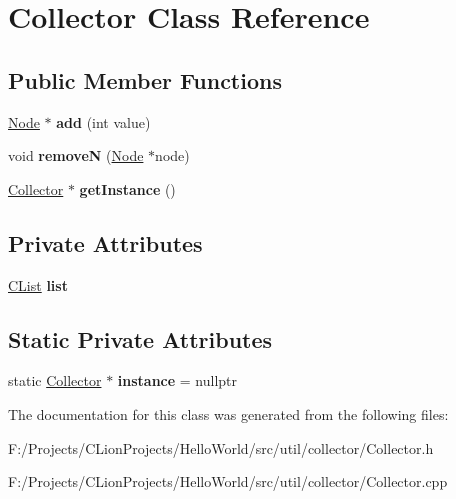 \hypertarget{class_collector}{}\section{Collector Class Reference}
\label{class_collector}
\subsection*{Public Member Functions}
\begin{DoxyCompactItemize}
\item 
\mbox{\label{class_collector_a29df7f72d577c7723f67e09a47189f29}} 
\mbox{\hyperlink{class_node}{Node}} $\ast$ {\bfseries add} (int value)
\item 
\mbox{\label{class_collector_ae680c12a228d5d35cabf816c2ac2586c}} 
void {\bfseries removeN} (\mbox{\hyperlink{class_node}{Node}} $\ast$node)
\item 
\mbox{\label{class_collector_ae39d639e26fd35099abf39b018a0f68e}} 
\mbox{\hyperlink{class_collector}{Collector}} $\ast$ {\bfseries get\+Instance} ()
\end{DoxyCompactItemize}
\subsection*{Private Attributes}
\begin{DoxyCompactItemize}
\item 
\mbox{\label{class_collector_a56f099f68f618222a58bbef070da8ca7}} 
\mbox{\hyperlink{class_c_list}{C\+List}} {\bfseries list}
\end{DoxyCompactItemize}
\subsection*{Static Private Attributes}
\begin{DoxyCompactItemize}
\item 
\mbox{\label{class_collector_a08a9b541505b62f5c1db1b7e341d64c5}} 
static \mbox{\hyperlink{class_collector}{Collector}} $\ast$ {\bfseries instance} = nullptr
\end{DoxyCompactItemize}


The documentation for this class was generated from the following files\+:\begin{DoxyCompactItemize}
\item 
F\+:/\+Projects/\+C\+Lion\+Projects/\+Hello\+World/src/util/collector/Collector.\+h\item 
F\+:/\+Projects/\+C\+Lion\+Projects/\+Hello\+World/src/util/collector/Collector.\+cpp\end{DoxyCompactItemize}
